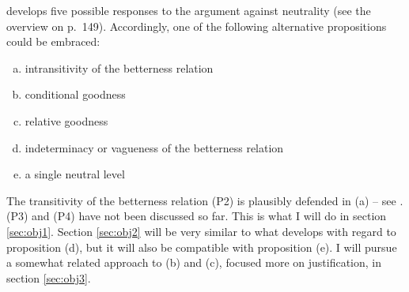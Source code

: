  develops five possible responses to the argument against neutrality (see the overview on p.~149). Accordingly, one of the following alternative propositions could be embraced: 

\begin{enumerate}[(a)]
\item intransitivity of the betterness relation 
\item conditional goodness 
\item relative goodness 
\item indeterminacy or vagueness of the betterness relation 
\item a single neutral level
\end{enumerate}

The transitivity of the betterness relation (P2) is plausibly defended in (a) -- see . 
(P3) and (P4) have not been discussed so far. This is what I will do in section \ref{sec:obj1}. 
Section \ref{sec:obj2} will be very similar to what  develops with regard to proposition (d), but it will also be compatible with proposition (e). 
I will pursue a somewhat related approach to (b) and (c), focused more on justification, in section \ref{sec:obj3}.